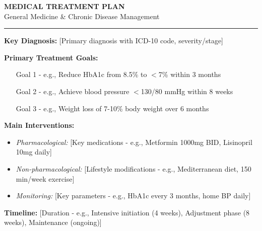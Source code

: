 \documentclass[11pt,letterpaper]{article}
\begin{document}
\begin{center}
{\Large\bfseries MEDICAL TREATMENT PLAN}\\[0.5em]
{\large General Medicine \& Chronic Disease Management}\\[0.5em]
\rule{\textwidth}{1pt}
\end{center}

\vspace{1em}

\begin{tcolorbox}[colback=blue!5!white,colframe=blue!75!black,title=\textbf{TREATMENT PLAN HIGHLIGHTS},fonttitle=\bfseries\large]

\textbf{Key Diagnosis:} [Primary diagnosis with ICD-10 code, severity/stage]

\vspace{0.3em}
\textbf{Primary Treatment Goals:}
\begin{itemize}[leftmargin=*,itemsep=0pt]
    \item [Goal 1 - e.g., Reduce HbA1c from 8.5\% to $<$7\% within 3 months]
    \item [Goal 2 - e.g., Achieve blood pressure $<$130/80 mmHg within 8 weeks]
    \item [Goal 3 - e.g., Weight loss of 7-10\% body weight over 6 months]
\end{itemize}

\vspace{0.3em}
\textbf{Main Interventions:}
\begin{itemize}[leftmargin=*,itemsep=0pt]
    \item \textit{Pharmacological:} [Key medications - e.g., Metformin 1000mg BID, Lisinopril 10mg daily]
    \item \textit{Non-pharmacological:} [Lifestyle modifications - e.g., Mediterranean diet, 150 min/week exercise]
    \item \textit{Monitoring:} [Key parameters - e.g., HbA1c every 3 months, home BP daily]
\end{itemize}

\vspace{0.3em}
\textbf{Timeline:} [Duration - e.g., Intensive initiation (4 weeks), Adjustment phase (8 weeks), Maintenance (ongoing)]

\end{tcolorbox}

\vspace{1em}

\end{document}
